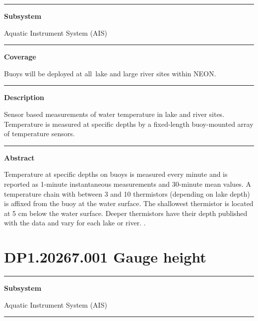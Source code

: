 \documentclass[]{article}
\begin{document}
\begin{center}\rule{0.5\linewidth}{\linethickness}\end{center}

\textbf{Subsystem}

Aquatic Instrument System (AIS)

\begin{center}\rule{0.5\linewidth}{\linethickness}\end{center}

\textbf{Coverage}

Buoys will be deployed at all~lake and large river sites within NEON.

\begin{center}\rule{0.5\linewidth}{\linethickness}\end{center}

\textbf{Description}

Sensor based measurements of water temperature in lake and river sites.
Temperature is measured at specific depths by a fixed-length
buoy-mounted array of temperature sensors.

\begin{center}\rule{0.5\linewidth}{\linethickness}\end{center}

\textbf{Abstract}

Temperature at specific depths on buoys is measured every minute and is
reported as 1-minute instantaneous measurements and 30-minute mean
values. A temperature chain with between 3 and 10 thermistors (depending
on lake depth) is affixed from the buoy at the water surface. The
shallowest thermistor is located at 5 cm below the water surface. Deeper
thermistors have their depth published with the data and vary for each
lake or river. \newpage
.

\section{DP1.20267.001 Gauge height}\label{dp1.20267.001-gauge-height}

\begin{center}\rule{0.5\linewidth}{\linethickness}\end{center}

\textbf{Subsystem}

Aquatic Instrument System (AIS)

\begin{center}\rule{0.5\linewidth}{\linethickness}\end{center}
\end{document}
